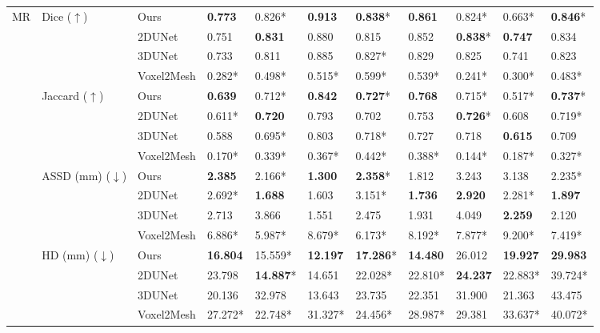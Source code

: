 \documentclass[times,review,preprint,authoryear]{elsarticle}
\begin{document}
\begin{table}[H]
{\begin{tabular}{llllllllll|l}
\cline{1-11}
\cline{2-11}
\multirow{16}{*}{MR} & \multirow{4}{*}{Dice ($\uparrow$)} & Ours &   \textbf{0.773} &   0.826* &   \textbf{0.913} &   \textbf{0.838}* &   \textbf{0.861} &   0.824* &   0.663* &   \textbf{0.846}* \\
   &         & 2DUNet &   0.751 &   \textbf{0.831} &   0.880 &   0.815 &   0.852 &   \textbf{0.838}* &   \textbf{0.747} &   0.834 \\
   &         & 3DUNet &   0.733 &   0.811 &   0.885 &   0.827* &   0.829 &   0.825 &   0.741 &   0.823 \\
   &         & Voxel2Mesh &   0.282* &   0.498* &   0.515* &   0.599* &   0.539* &   0.241* &   0.300* &   0.483* \\
\cline{2-11}
   & \multirow{4}{*}{Jaccard ($\uparrow$)} & Ours &   \textbf{0.639} &   0.712* &   \textbf{0.842} &   \textbf{0.727}* &   \textbf{0.768} &   0.715* &   0.517* &   \textbf{0.737}* \\
   &         & 2DUNet &   0.611* &   \textbf{0.720} &   0.793 &   0.702 &   0.753 &   \textbf{0.726}* &   0.608 &   0.719* \\
   &         & 3DUNet &   0.588 &   0.695* &   0.803 &   0.718* &   0.727 &   0.718 &   \textbf{0.615} &   0.709 \\
   &         & Voxel2Mesh &   0.170* &   0.339* &   0.367* &   0.442* &   0.388* &   0.144* &   0.187* &   0.327* \\
\cline{2-11}
   & \multirow{4}{*}{ASSD (mm) ($\downarrow$)} & Ours &   \textbf{2.385}&   2.166*&   \textbf{1.300} &   \textbf{2.358}* &   1.812 &   3.243 &   3.138 &   2.235* \\
   &         & 2DUNet &   2.692* &   \textbf{1.688} &   1.603 &   3.151* &   \textbf{1.736} &   \textbf{2.920} &   2.281* &   \textbf{1.897} \\
   &         & 3DUNet &   2.713 &   3.866 &   1.551 &   2.475 &   1.931 &   4.049 &   \textbf{2.259} &   2.120 \\
   &         & Voxel2Mesh &   6.886* &   5.987* &   8.679* &   6.173* &   8.192* &   7.877* &   9.200* &   7.419* \\
\cline{2-11}
   & \multirow{4}{*}{HD (mm) ($\downarrow$)} & Ours &  \textbf{16.804} &  15.559* &  \textbf{12.197} &  \textbf{17.286}* &  \textbf{14.480} &  26.012 &  \textbf{19.927} &  \textbf{29.983} \\
   &         & 2DUNet &  23.798 &  \textbf{14.887}* &  14.651 &  22.028* &  22.810* &  \textbf{24.237} &  22.883* &  39.724* \\
   &         & 3DUNet &  20.136 &  32.978 &  13.643 &  23.735 &  22.351 &  31.900 &  21.363 &  43.475 \\
   &         & Voxel2Mesh &  27.272* &  22.748* &  31.327* &  24.456* &  28.987* &  29.381 &  33.637* &  40.072* \\
\bottomrule
\end{tabular}
}
\end{table}
\end{document}

